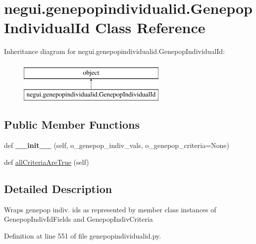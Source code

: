 \hypertarget{classnegui_1_1genepopindividualid_1_1GenepopIndividualId}{}\section{negui.\+genepopindividualid.\+Genepop\+Individual\+Id Class Reference}
\label{classnegui_1_1genepopindividualid_1_1GenepopIndividualId}
Inheritance diagram for negui.\+genepopindividualid.\+Genepop\+Individual\+Id\+:\begin{figure}[H]
\begin{center}
\leavevmode
\includegraphics[height=2.000000cm]{classnegui_1_1genepopindividualid_1_1GenepopIndividualId}
\end{center}
\end{figure}
\subsection*{Public Member Functions}
\begin{DoxyCompactItemize}
\item 
def {\bfseries \+\_\+\+\_\+init\+\_\+\+\_\+} (self, o\+\_\+genepop\+\_\+indiv\+\_\+vals, o\+\_\+genepop\+\_\+criteria=None)\hypertarget{classnegui_1_1genepopindividualid_1_1GenepopIndividualId_a6a5d9b3214414313abf23acdea0e8dbc}{}\label{classnegui_1_1genepopindividualid_1_1GenepopIndividualId_a6a5d9b3214414313abf23acdea0e8dbc}

\item 
def \hyperlink{classnegui_1_1genepopindividualid_1_1GenepopIndividualId_ab25e0ae796fa9574369af186b1e2e6c0}{all\+Criteria\+Are\+True} (self)
\end{DoxyCompactItemize}


\subsection{Detailed Description}
\begin{DoxyVerb}Wraps genepop indiv. ids as
represented by member class instances
of GenepopIndivIdFields and GenepopIndivCriteria
\end{DoxyVerb}
 

Definition at line 551 of file genepopindividualid.\+py.



